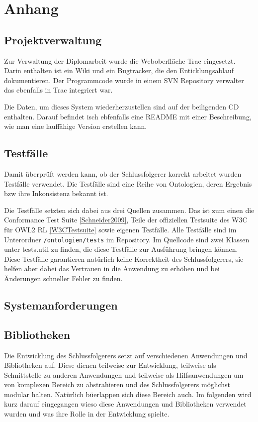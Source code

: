 \chapter{Anhang}

\section{Projektverwaltung}
Zur Verwaltung der Diplomarbeit wurde die Weboberfläche Trac eingesetzt. Darin enthalten ist ein Wiki und ein Bugtracker, die den Enticklungsablauf dokumentieren. Der Programmcode wurde in einem SVN Repository verwalter das ebenfalls in Trac integriert war.

Die Daten, um dieses System wiederherzustellen sind auf der beiligenden CD enthalten. Darauf befindet isch ebfenfalls eine README mit einer Beschreibung, wie man eine lauffähige Version erstellen kann.

\section{Testfälle}
Damit überprüft werden kann, ob der Schlussfolgerer korrekt arbeitet wurden Testfälle verwendet. Die Testfälle sind eine Reihe von Ontologien, deren Ergebnis bzw ihre Inkonsistenz bekannt ist.

Die Testfälle setzten sich dabei aus drei Quellen zusammen. Das ist zum einen die Conformance Test Suite \ref{Schneider2009}, Teile der offiziellen Testsuite des W3C für OWL2 RL \ref{W3CTestsuite} sowie eigenen Testfälle. Alle Testfälle sind im Unterordner \texttt{/ontologien/tests} im Repository. Im Quellcode sind zwei Klassen unter tests.util zu finden, die diese Testfälle zur Ausführung bringen können. Diese Testfälle garantieren natürlich keine Korrektheit des Schlussfolgerers, sie helfen aber dabei das Vertrauen in die Anwendung zu erhöhen und bei Änderungen schneller Fehler zu finden.

\section{Systemanforderungen}
\section{Bibliotheken}
Die Entwicklung des Schlussfolgerers setzt auf verschiedenen Anwendungen und Bibliotheken auf. Diese dienen teilweise zur Entwicklung, teilweise als Schnittstelle zu anderen Anwendungen und teilweise als Hilfsanwendungen um von komplexen Bereich zu abstrahieren und des Schlussfolgerers möglichst modular halten. Natürlich büerlappen sich diese Bereich auch. Im folgenden wird kurz darauf eingegangen wieso diese Anwendungen und Bibliotheken verwendet wurden und was ihre Rolle in der Entwicklung spielte.

